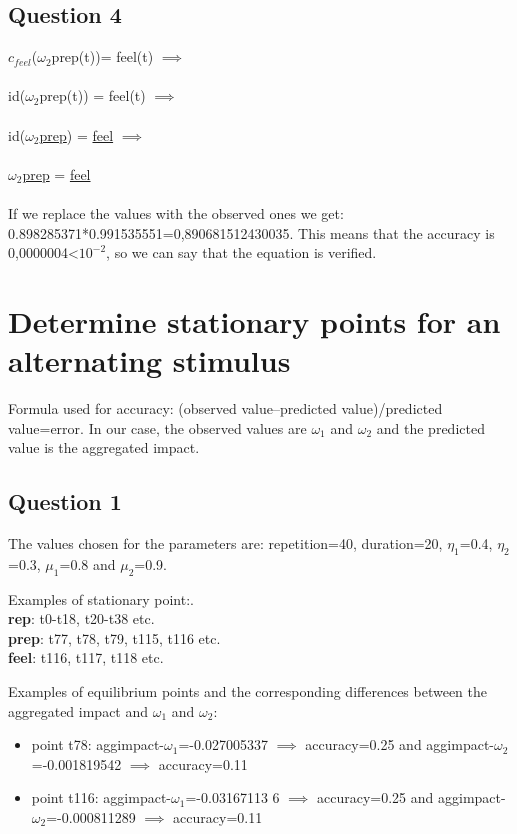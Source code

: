 \documentclass[a4paper]{article}
\begin{document}
\subsection{Question 4}

$c_{feel}$($\omega_{2}$prep(t))= feel(t) $\implies$ \\ \\
id($\omega_{2}$prep(t)) = feel(t) $\implies$ \\ \\
id($\omega_{2}$\underline{prep}) = \underline{feel} $\implies$\\ \\
$\omega_{2}$\underline{prep} = \underline{feel}\\ \\

If we replace the values with the observed ones we get: 0.898285371*0.991535551=0,890681512430035. This means that the accuracy is 0,0000004<$10^{-2}$, so we can say that the equation is verified.



\section{Determine stationary points for an alternating stimulus}

Formula used for accuracy: (observed value–predicted value)/predicted value=error. In our case, the observed values are $\omega_{1}$ and $\omega_{2}$ and the predicted value is the aggregated impact.

\subsection{Question 1}

The values chosen for the parameters are: repetition=40, duration=20, $\eta_{1}$=0.4, $\eta_{2}$=0.3, $\mu_{1}$=0.8 and $\mu_{2}$=0.9.

Examples of stationary point:. \\
\textbf{rep}: t0-t18, t20-t38 etc. \\
\textbf{prep}: t77, t78, t79, t115, t116 etc.	\\
\textbf{feel}: t116, t117, t118 etc.

Examples of equilibrium points and the corresponding differences between the aggregated impact and $\omega_{1}$ and $\omega_{2}$:
\begin{itemize}
\item point t78: aggimpact-$\omega_{1}$=-0.027005337 $\implies$ accuracy=0.25 and aggimpact-$\omega_{2}$=-0.001819542 $\implies$ accuracy=0.11 
\item point t116: aggimpact-$\omega_{1}$=-0.03167113 6 $\implies$ accuracy=0.25 and aggimpact-$\omega_{2}$=-0.000811289 $\implies$ accuracy=0.11
\end{itemize}
\end{document}
